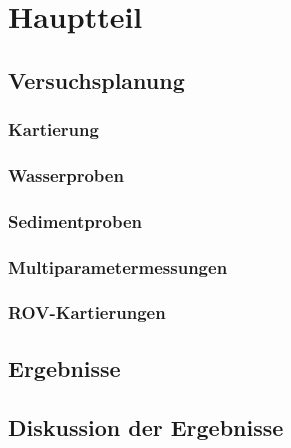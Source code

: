 

\chapter[Hauptteil]{Hauptteil}

\section{Versuchsplanung}

\subsection{Kartierung}
    
    
\subsection{Wasserproben}
\subsection{Sedimentproben}
\subsection{Multiparametermessungen}
\subsection{ROV-Kartierungen}

\section{Ergebnisse}
\section{Diskussion der Ergebnisse}
    

